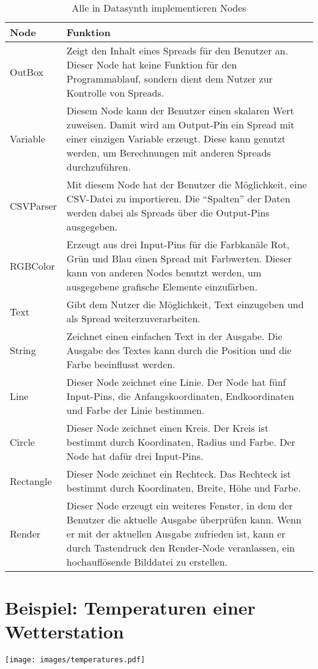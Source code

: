 \documentclass[a4paper, 
               12pt,
               DIV=calc,
               version=first,
               pdftex,
               headsepline,
               footsepline,
               bibtotocnumbered,
               liststotocnumbered]{scrreprt}
\begin{document}
\begin{table}
\centering
\begin{tabular}{|l|p{10cm}|}
\hline
\textbf{Node} & \textbf{Funktion}\\
\hline
OutBox & Zeigt den Inhalt eines Spreads für den Benutzer an. Dieser Node hat keine Funktion für den Programmablauf, sondern
dient dem Nutzer zur Kontrolle von Spreads.\\
\hline
Variable & Diesem Node kann der Benutzer einen skalaren Wert zuweisen. Damit wird am Output-Pin ein Spread mit einer einzigen
Variable erzeugt. Diese kann genutzt werden, um Berechnungen mit anderen Spreads durchzuführen.\\
\hline
CSVParser & Mit diesem Node hat der Benutzer die Möglichkeit, eine CSV-Datei zu importieren.
Die "`Spalten"' der Daten werden dabei als Spreads über die Output-Pins ausgegeben.\\
\hline
RGBColor & Erzeugt aus drei Input-Pins für die Farbkanäle Rot, Grün und Blau einen Spread mit Farbwerten. Dieser
kann von anderen Nodes benutzt werden, um ausgegebene grafische Elemente einzufärben.\\
\hline
Text & Gibt dem Nutzer die Möglichkeit, Text einzugeben und als Spread weiterzuverarbeiten.\\
\hline
String & Zeichnet einen einfachen Text in der Ausgabe. Die Ausgabe des Textes kann durch die Position und die Farbe beeinflusst werden.\\
\hline
Line & Dieser Node zeichnet eine Linie. Der Node hat fünf Input-Pins, die Anfangskoordinaten, Endkoordinaten und Farbe
der Linie bestimmen.\\
\hline
Circle & Dieser Node zeichnet einen Kreis. Der Kreis ist bestimmt durch Koordinaten, Radius und Farbe. Der Node
hat dafür drei Input-Pins.\\
\hline
Rectangle & Dieser Node zeichnet ein Rechteck. Das Rechteck ist bestimmt durch Koordinaten, Breite, Höhe und Farbe.\\
\hline
Render & Dieser Node erzeugt ein weiteres Fenster, in dem der Benutzer die aktuelle Ausgabe überprüfen kann.
Wenn er mit der aktuellen Ausgabe zufrieden ist, kann er durch Tastendruck den Render-Node veranlassen, ein
hochauflösende Bilddatei zu erstellen.\\
\hline
\end{tabular}
\caption{Alle in Datasynth implementieren Nodes}
\label{tab:alleNodes}
\end{table}


\section{Beispiel: Temperaturen einer Wetterstation}
\label{sec:temperatures}
\centering
\texttt{[image: images/temperatures.pdf]}
\end{document}
